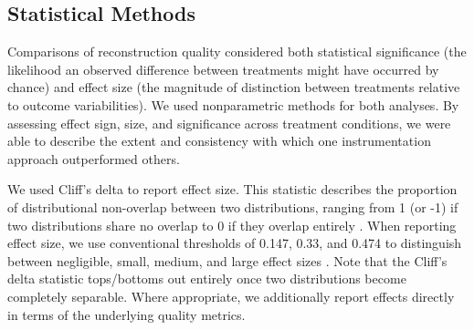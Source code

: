 % 


\subsection{Statistical Methods}

Comparisons of reconstruction quality considered both statistical significance (the likelihood an observed difference between treatments might have occurred by chance) and effect size (the magnitude of distinction between treatments relative to outcome variabilities).
We used nonparametric methods for both analyses.
By assessing effect sign, size, and significance across treatment conditions, we were able to describe the extent and consistency with which one instrumentation approach outperformed others.

We used Cliff's delta to report effect size.
This statistic describes the proportion of distributional non-overlap between two distributions, ranging from 1 (or -1) if two distributions share no overlap to 0 if they overlap entirely \citep{cliff1993dominance}.
When reporting effect size, we use conventional thresholds of 0.147, 0.33, and 0.474 to distinguish between negligible, small, medium, and large effect sizes \citep{hess2004robust}.
Note that the Cliff's delta statistic tops/bottoms out entirely once two distributions become completely separable.
Where appropriate, we additionally report effects directly in terms of the underlying quality metrics.

